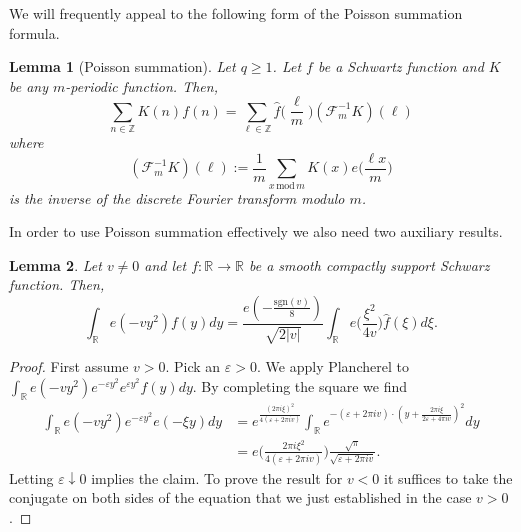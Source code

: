 \documentclass[12pt,reqno]{amsart}
\theoremstyle{plain}
\newtheorem{lemma}{Lemma}
\numberwithin{equation}{section}
\numberwithin{figure}{section}
\theoremstyle{plain}
\theoremstyle{definition}
\theoremstyle{remark}
\newcommand{\mmod}{\,\mathrm{mod}\,}
\begin{document}
We will frequently appeal to the following form of the Poisson summation formula. 

  \begin{lemma}[Poisson summation] \label{le:poisson} 
  Let $q \geq 1$.
    Let $f$ be a Schwartz function and $K$ be any 
  $m$-periodic function.
    Then,
    $$ \sum_{n \in \mathbb{Z}} K(n) f(n) = 
    \sum_{\ell \in \mathbb{Z}} 
    \widehat{f} \Big ( \frac{\ell}{m} \Big ) 
    (\mathcal{F}_m^{-1}K)(\ell) $$
    where
    $$ (\mathcal{F}_m^{-1} K)(\ell) 
    := \frac{1}{m}\sum_{x \mmod{m}} 
    K(x) e \Big ( \frac{\ell x}{m} \Big ) $$
    is the inverse of the discrete Fourier transform modulo $m$. 
  \end{lemma}

  In order to use Poisson summation effectively
   we also need two auxiliary results.

\begin{lemma}\label{le:dist}
  Let $v \neq 0$ and let $f : \mathbb{R} \rightarrow \mathbb{R}$ be a smooth compactly support Schwarz function. Then, 
  $$
  \int_{\mathbb{R}} e(-v y^2) f(y) dy = \frac{e(-\tfrac {\mathrm{sgn}(v)}{8})}{\sqrt{2 |v|}} \int_{\mathbb{R}} e \Big (  \frac{\xi^2}{4 v} \Big ) \widehat{f}(\xi) d \xi.
  $$
\end{lemma}
\begin{proof}
  First assume $v > 0$. Pick an $\varepsilon > 0$. 
  We apply Plancherel to
  $
  \int_{\mathbb{R}} e(-v y^2) e^{-\varepsilon y^2} e^{\varepsilon y^2} f(y) dy.
  $
  By completing the square we find
 \begin{align*}
   \int_{\mathbb{R}} e(- v y^2) e^{-\varepsilon y^2} e(- \xi y) dy & = e^{\frac{(2\pi i\xi)^2}{4 (\varepsilon + 2 \pi i v)}} \int_{\mathbb{R}} e^{- (\varepsilon + 2\pi i v) \cdot ( y + \frac{2\pi i\xi}{2\varepsilon + 4\pi i v}  )^2} dy \\ & =
  e \Big ( \frac{2 \pi i \xi^2}{4 (\varepsilon + 2 \pi i v)} \Big ) \frac{\sqrt{\pi}}{\sqrt{\varepsilon + 2 \pi i v}}.
  \end{align*}
  Letting $\varepsilon \downarrow 0$ implies the claim. 
  To prove the result for $v < 0$ it suffices to take the conjugate on both sides of the equation that 
  we just established in the case $v > 0$. 
\end{proof}
\end{document}
